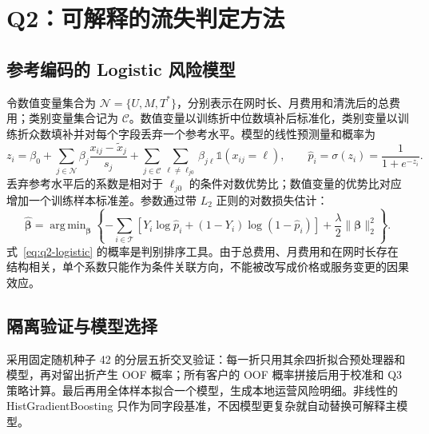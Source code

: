 \documentclass[UTF8,a4paper,11pt]{ctexart}
\DeclareMathOperator{\argmin}{arg\,min}
\begin{document}
\section{Q2：可解释的流失判定方法}\label{sec:q2}

\subsection{参考编码的 Logistic 风险模型}
令数值变量集合为 \(\mathcal N=\{U,M,T^*\}\)，分别表示在网时长、月费用和清洗后的总费用；类别变量集合记为 \(\mathcal C\)。数值变量以训练折中位数填补后标准化，类别变量以训练折众数填补并对每个字段丢弃一个参考水平。模型的线性预测量和概率为
\begin{equation}
z_i=\beta_0+\sum_{j\in\mathcal N}\beta_j\frac{x_{ij}-\widetilde x_j}{s_j}
 +\sum_{j\in\mathcal C}\sum_{\ell\ne\ell_{j0}}\beta_{j\ell}\mathbb{1}(x_{ij}=\ell),
\qquad \widehat p_i=\sigma(z_i)=\frac{1}{1+e^{-z_i}}.
\label{eq:q2-logistic}
\end{equation}
丢弃参考水平后的系数是相对于 \(\ell_{j0}\) 的条件对数优势比；数值变量的优势比对应增加一个训练样本标准差。参数通过带 \(L_2\) 正则的对数损失估计：
\begin{equation}
\widehat{\bm\beta}=\argmin_{\bm\beta}\left\{-\sum_{i\in\mathcal T}\left[Y_i\log \widehat p_i+(1-Y_i)\log(1-\widehat p_i)\right]+\frac{\lambda}{2}\lVert\bm\beta\rVert_2^2\right\}.
\label{eq:q2-fit}
\end{equation}
式~\eqref{eq:q2-logistic} 的概率是判别排序工具。由于总费用、月费用和在网时长存在结构相关，单个系数只能作为条件关联方向，不能被改写成价格或服务变更的因果效应。

\subsection{隔离验证与模型选择}
采用固定随机种子 42 的分层五折交叉验证：每一折只用其余四折拟合预处理器和模型，再对留出折产生 OOF 概率；所有客户的 OOF 概率拼接后用于校准和 Q3 策略计算。最后再用全体样本拟合一个模型，生成本地运营风险明细。非线性的 HistGradientBoosting 只作为同字段基准，不因模型更复杂就自动替换可解释主模型。
\end{document}
